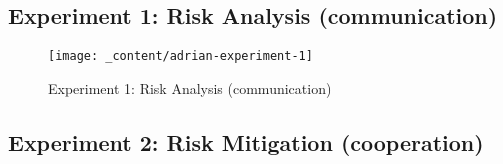 \subsection{Experiment 1: Risk Analysis (communication)}

\begin{figure}[H]
    \centering
    \texttt{[image: \_content/adrian-experiment-1]}
    \caption{Experiment 1: Risk Analysis (communication)}
    \label{fig:experiment-1}
\end{figure}

\subsection{Experiment 2: Risk Mitigation (cooperation)}

